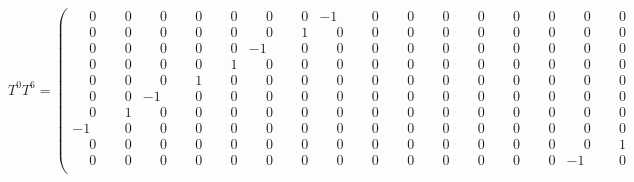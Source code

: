 \documentclass[10pt]{article}
\begin{document}
\[
T^{0}T^{6} = \left(\begin{smallmatrix}
\phantom{-}0 & \phantom{-}0 & \phantom{-}0 & \phantom{-}0 & \phantom{-}0 & \phantom{-}0 & \phantom{-}0 & -1 & \phantom{-}0 & \phantom{-}0 & \phantom{-}0 & \phantom{-}0 & \phantom{-}0 & \phantom{-}0 & \phantom{-}0 & \phantom{-}0 \\
\phantom{-}0 & \phantom{-}0 & \phantom{-}0 & \phantom{-}0 & \phantom{-}0 & \phantom{-}0 & \phantom{-}1 & \phantom{-}0 & \phantom{-}0 & \phantom{-}0 & \phantom{-}0 & \phantom{-}0 & \phantom{-}0 & \phantom{-}0 & \phantom{-}0 & \phantom{-}0 \\
\phantom{-}0 & \phantom{-}0 & \phantom{-}0 & \phantom{-}0 & \phantom{-}0 & -1 & \phantom{-}0 & \phantom{-}0 & \phantom{-}0 & \phantom{-}0 & \phantom{-}0 & \phantom{-}0 & \phantom{-}0 & \phantom{-}0 & \phantom{-}0 & \phantom{-}0 \\
\phantom{-}0 & \phantom{-}0 & \phantom{-}0 & \phantom{-}0 & \phantom{-}1 & \phantom{-}0 & \phantom{-}0 & \phantom{-}0 & \phantom{-}0 & \phantom{-}0 & \phantom{-}0 & \phantom{-}0 & \phantom{-}0 & \phantom{-}0 & \phantom{-}0 & \phantom{-}0 \\
\phantom{-}0 & \phantom{-}0 & \phantom{-}0 & \phantom{-}1 & \phantom{-}0 & \phantom{-}0 & \phantom{-}0 & \phantom{-}0 & \phantom{-}0 & \phantom{-}0 & \phantom{-}0 & \phantom{-}0 & \phantom{-}0 & \phantom{-}0 & \phantom{-}0 & \phantom{-}0 \\
\phantom{-}0 & \phantom{-}0 & -1 & \phantom{-}0 & \phantom{-}0 & \phantom{-}0 & \phantom{-}0 & \phantom{-}0 & \phantom{-}0 & \phantom{-}0 & \phantom{-}0 & \phantom{-}0 & \phantom{-}0 & \phantom{-}0 & \phantom{-}0 & \phantom{-}0 \\
\phantom{-}0 & \phantom{-}1 & \phantom{-}0 & \phantom{-}0 & \phantom{-}0 & \phantom{-}0 & \phantom{-}0 & \phantom{-}0 & \phantom{-}0 & \phantom{-}0 & \phantom{-}0 & \phantom{-}0 & \phantom{-}0 & \phantom{-}0 & \phantom{-}0 & \phantom{-}0 \\
-1 & \phantom{-}0 & \phantom{-}0 & \phantom{-}0 & \phantom{-}0 & \phantom{-}0 & \phantom{-}0 & \phantom{-}0 & \phantom{-}0 & \phantom{-}0 & \phantom{-}0 & \phantom{-}0 & \phantom{-}0 & \phantom{-}0 & \phantom{-}0 & \phantom{-}0 \\
\phantom{-}0 & \phantom{-}0 & \phantom{-}0 & \phantom{-}0 & \phantom{-}0 & \phantom{-}0 & \phantom{-}0 & \phantom{-}0 & \phantom{-}0 & \phantom{-}0 & \phantom{-}0 & \phantom{-}0 & \phantom{-}0 & \phantom{-}0 & \phantom{-}0 & \phantom{-}1 \\
\phantom{-}0 & \phantom{-}0 & \phantom{-}0 & \phantom{-}0 & \phantom{-}0 & \phantom{-}0 & \phantom{-}0 & \phantom{-}0 & \phantom{-}0 & \phantom{-}0 & \phantom{-}0 & \phantom{-}0 & \phantom{-}0 & \phantom{-}0 & -1 & \phantom{-}0 \\

\end{smallmatrix}\]
\end{document}

